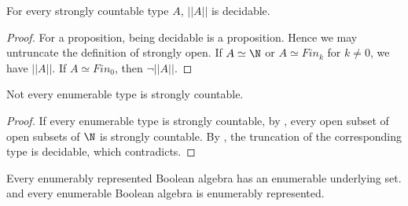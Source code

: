 \begin{lemma}\label{StronglyCountableTruncationDecidable}
  For every strongly countable type $A$, $||A||$ is decidable. 
\end{lemma}
\begin{proof}
  For a proposition, being decidable is a proposition. 
  Hence we may untruncate the definition of strongly open. 
  If $A \simeq \N$ or $A\simeq Fin_k$ for $k\neq 0$, we have $||A||$. 
  If $A \simeq Fin_0$, then $\neg ||A||$. 
\end{proof}

\begin{corollary}
  Not every enumerable type is strongly countable.
\end{corollary}
\begin{proof}
  If every enumerable type is strongly countable, 
  by , every open subset of open subsets of $\N$ is strongly countable. 
  By , the truncation of the corresponding type is decidable, which 
  contradicts.
\end{proof}

\begin{remark}
  Every enumerably represented Boolean algebra has an enumerable underlying set. 
  and every enumerable Boolean algebra is enumerably represented. 
\end{remark}
